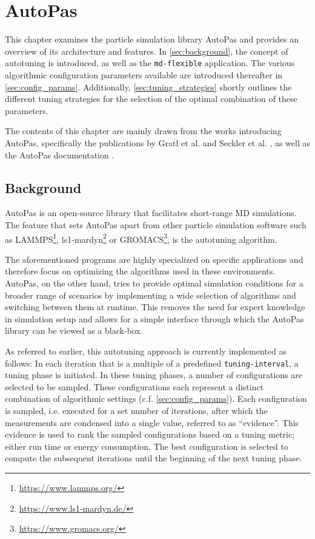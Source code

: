 \chapter[AutoPas]{AutoPas}
\label{cp:autopas}

{
	\parindent0pt
	This chapter examines the particle simulation library AutoPas and provides an overview of its architecture and features. In \autoref{sec:background}, the concept of autotuning is introduced, as well as the \texttt{md-flexible} application. %
	The various algorithmic configuration parameters available  are introduced thereafter in \autoref{sec:config_params}. Additionally, \autoref{sec:tuning_strategies} shortly outlines the different tuning strategies for the selection of the optimal combination of these parameters.

	The contents of this chapter are mainly drawn from the works introducing AutoPas, specifically the publications by Gratl et al. \cite{Gratl2019, Gratl2021, GratlGassner2025} and Seckler et al. \cite{Seckler2021}, as well as the AutoPas documentation \cite{AutoPas2025}.
}


\section{Background}
\label{sec:background}
AutoPas is an open-source \CC{} library that facilitates short-range MD simulations. The feature that sets AutoPas apart from other particle simulation software such as LAMMPS\footnote{\href{https://www.lammps.org/}{https://www.lammps.org/}}, ls1-mardyn\footnote{\href{https://www.ls1-mardyn.de/}{https://www.ls1-mardyn.de/}} or GROMACS\footnote{\href{https://www.gromacs.org/}{https://www.gromacs.org/}}, is the autotuning algorithm.

The aforementioned programs are highly specialized on specific applications and therefore focus on optimizing the algorithms used in these environments.
AutoPas, on the other hand, tries to provide optimal simulation conditions for a broader range of scenarios by implementing a wide selection of algorithms and switching between them at runtime.
This removes the need for expert knowledge in simulation setup and allows for a simple interface through which the AutoPas library can be viewed as a black-box.

As referred to earlier, this autotuning approach is currently implemented as follows: In each iteration that is a multiple of a predefined \texttt{tuning-interval}, a tuning phase is initiated. In these tuning phases, a number of configurations are selected to be sampled. These configurations each represent a distinct combination of algorithmic settings (c.f. \autoref{sec:config_params}). Each configuration is sampled, i.e. executed for a set number of iterations, after which the measurements are condensed into a single value, referred to as \enquote{evidence}. This evidence is used to rank the sampled configurations based on a tuning metric; either run time or energy consumption. The best configuration is selected to compute the subsequent iterations until the beginning of the next tuning phase.

